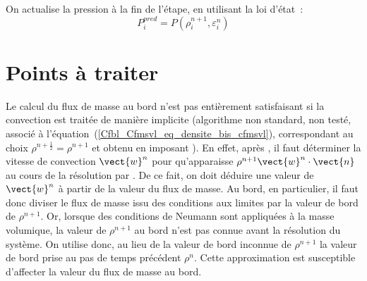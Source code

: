 On actualise la pression à la fin de l'étape, en utilisant la loi d'état~:
\begin{equation}
\displaystyle P_i^{pred}=P(\rho_i^{n+1},\varepsilon_i^{n})
\end{equation}


\section*{Points à traiter}
Le calcul du flux de masse au  bord n'est pas entièrement satisfaisant
si la convection est traitée de manière implicite
(algorithme non standard, non testé,
associé à l'équation~(\ref{Cfbl_Cfmsvl_eq_densite_bis_cfmsvl}),
correspondant au choix $\rho^{n+\frac{1}{2}}=\rho^{n+1}$ et
obtenu en imposant ).
En effet, après , il faut déterminer la vitesse de
convection $\vect{w}^n$ pour qu'apparaisse
$\rho^{n+1} \vect{w}^n\cdot\vect{n}$
au cours de la résolution par . De ce fait, on doit déduire
une valeur de $\vect{w}^n$ à partir de la valeur
du flux de masse. Au bord, en particulier, il faut
donc diviser le flux de masse
issu des conditions aux limites par la valeur de bord de $\rho^{n+1}$.
Or, lorsque des conditions de Neumann sont appliquées à la
masse volumique,
la valeur de $\rho^{n+1}$ au bord n'est pas connue avant la résolution du
système. On utilise donc, au lieu de la valeur de bord inconnue de
$\rho^{n+1}$ la valeur de bord prise au pas de temps
précédent $\rho^{n}$. Cette approximation est susceptible
d'affecter la valeur du flux de masse au bord.
